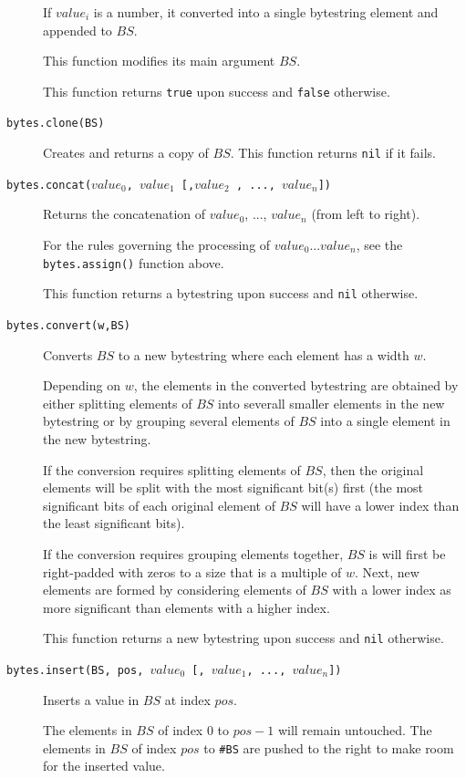 \documentclass[11pt]{report}
\begin{document}
\begin{description}
{  If $value_i$ is a number, it converted into a single bytestring element and 
  appended to $BS$.

  This function modifies its main argument $BS$.

  This function returns \texttt{true} upon success and \texttt{false} otherwise.
} 

\item[\texttt{bytes.clone(BS)}]
{
  Creates and returns a copy of $BS$.
  This function returns \texttt{nil} if it fails.
}

\item[\texttt{bytes.concat($value_0$, $value_1$ [,$value_2$ , ..., $value_n$])}]
{
  Returns the concatenation of $value_0$, ..., $value_n$ (from left to right).

  For the rules governing the processing of $value_0 ... value_n$, see
  the \texttt{bytes.assign()} function above.

  This function returns a bytestring upon success and \texttt{nil} otherwise.
}

\item[\texttt{bytes.convert(w,BS)}]
{
  Converts $BS$ to a new bytestring where each element has a width $w$.

  Depending on $w$, the elements in the converted bytestring are obtained by either 
  splitting elements of $BS$ into severall smaller elements in the new bytestring or 
  by grouping several elements of $BS$ into a single element in the new bytestring.

  If the conversion requires splitting elements of $BS$, then the original elements will
  be split with the most significant bit(s) first (the most significant bits of each 
  original element of $BS$ will have a lower index than the least significant bits). 

  If the conversion requires grouping elements together, $BS$ is will first be 
  right-padded with zeros to a size that is a multiple of $w$. Next, new 
  elements are formed by considering elements of $BS$ with a lower index as more 
  significant than elements with a higher index.

  This function returns a new bytestring upon success and \texttt{nil} otherwise.
}

\item[\texttt{bytes.insert(BS, pos, $value_0$ [, $value_1$, ..., $value_n$])}]
{
  Inserts a value in $BS$ at index $pos$.

  The elements in $BS$ of index 0 to $pos-1$ will remain untouched.
  The elements in $BS$ of index $pos$ to \texttt{\#BS} are pushed to the right
  to make room for the inserted value.

}
\end{description}
\end{document}
